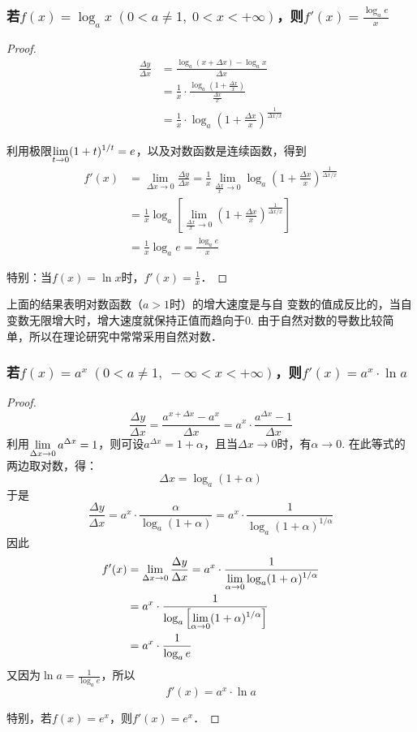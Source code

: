 \subsubsection{若$f(x)=\log_a x\; (0<a\ne 1,\; 0<x<+\infty)$，则$f'(x)=\frac{\log_a e}{x}$}

\begin{proof}
\begin{align*}
    \frac{\Delta y}{\Delta x}&=\frac{\log_a(x+\Delta x)-\log_a x}{\Delta x}\\
    &=\frac{1}{x}\cdot \frac{\log_a\left(1+\frac{\Delta x}{x}\right)}{\frac{\Delta x}{x}}\\
    &=\frac{1}{x}\cdot \log_a\left(1+\frac{\Delta x}{x}\right)^{\tfrac{1}{\Delta x/x}}
\end{align*}  

利用极限$\displaystyle\lim_{t\to 0}(1+t)^{1/t}=e$，以及对数函数是连续函数，得到
\begin{align*}
    f'(x)&=\lim_{\Delta x\to 0}\frac{\Delta y}{\Delta x}=\frac{1}{x}\lim_{\tfrac{\Delta x}{x}\to 0}\log_a\left(1+\frac{\Delta x}{x}\right)^{\tfrac{1}{\Delta x/x}}\\
    &=\frac{1}{x}\log_a\left[\lim_{\tfrac{\Delta x}{x}\to 0}\left(1+\frac{\Delta x}{x}\right)^{\tfrac{1}{\Delta x/x}}\right]\\
    &=\frac{1}{x}\log_a e=\frac{\log_a e}{x}
\end{align*}

特别：当$f(x)=\ln x$时，$f'(x)=\frac{1}{x}$．
\end{proof}

上面的结果表明对数函数（$a>1$时）的增大速度是与自
变数的值成反比的，当自变数无限增大时，增大速度就保持正值而趋向于0. 由于自然对数的导数比较简单，所以在理论研究中常常采用自然对数．

\subsubsection{若$f(x)=a^x\; (0<a\ne 1,\; -\infty<x<+\infty)$，则$f'(x)=a^x\cdot \ln a$}

\begin{proof}
    \[\frac{\Delta y}{\Delta x}=\frac{a^{x+\Delta x}-a^x}{\Delta x}=a^x\cdot \frac{a^{\Delta x}-1}{\Delta x}\]
利用$\displaystyle\lim_{\Delta x\to 0}a^{\Delta x}=1$，则可设$a^{\Delta x}=1+\alpha$，且当$\Delta x\to 0$时，有$\alpha\to 0$. 在此等式的两边取对数，得：
\[\Delta x=\log_a(1+\alpha)\]
于是
\[\frac{\Delta y}{\Delta x}=a^x\cdot \frac{\alpha}{\log_a(1+\alpha)}=a^x\cdot \frac{1}{\log_a(1+\alpha)^{1/\alpha}}\]
因此
\begin{align*}
    f'(x)&=\lim_{\Delta x\to 0}\dfrac{\Delta y}{\Delta x}=a^x\cdot \dfrac{1}{\displaystyle\lim_{\alpha\to 0}\log_a(1+\alpha)^{1/\alpha}}\\
    &=a^x\cdot \dfrac{1}{\log_a\left[\displaystyle\lim_{\alpha\to 0}(1+\alpha)^{1/\alpha}\right]}\\
    &=a^x\cdot \dfrac{1}{\log_a e}
\end{align*}
又因为$\ln a=\frac{1}{\log_a e}$，所以
\[f'(x)=a^x\cdot \ln a\]

特别，若$f(x)=e^x$，则$f'(x)=e^x$．
\end{proof}

